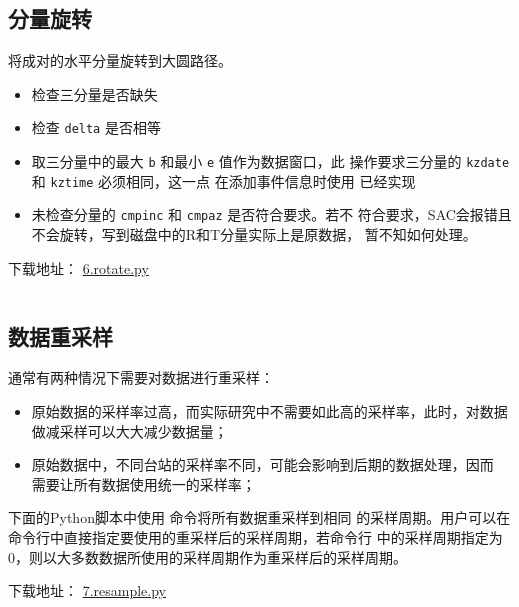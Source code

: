 \subsection{分量旋转}
\label{subsec:rotate-python}
将成对的水平分量旋转到大圆路径。
\begin{itemize}
\item 检查三分量是否缺失
\item 检查 \texttt{delta} 是否相等
\item 取三分量中的最大 \texttt{b} 和最小 \texttt{e} 值作为数据窗口，此
    操作要求三分量的 \texttt{kzdate} 和 \texttt{kztime} 必须相同，这一点
    在添加事件信息时使用  已经实现
\item 未检查分量的 \texttt{cmpinc} 和 \texttt{cmpaz} 是否符合要求。若不
    符合要求，SAC会报错且不会旋转，写到磁盘中的R和T分量实际上是原数据，
    暂不知如何处理。
\end{itemize}

下载地址： \href{https://raw.githubusercontent.com/seisman/SAC_Docs_zh/master/call-in-script/6.rotate.py}{6.rotate.py}
\inputminted{python}{./call-in-script/6.rotate.py}

\subsection{数据重采样}
\label{subsec:resample-python}
通常有两种情况下需要对数据进行重采样：
\begin{itemize}
\item 原始数据的采样率过高，而实际研究中不需要如此高的采样率，此时，对数据
    做减采样可以大大减少数据量；
\item 原始数据中，不同台站的采样率不同，可能会影响到后期的数据处理，因而
    需要让所有数据使用统一的采样率；
\end{itemize}
下面的Python脚本中使用  命令将所有数据重采样到相同
的采样周期。用户可以在命令行中直接指定要使用的重采样后的采样周期，若命令行
中的采样周期指定为0，则以大多数数据所使用的采样周期作为重采样后的采样周期。

下载地址： \href{https://raw.githubusercontent.com/seisman/SAC_Docs_zh/master/call-in-script/7.resample.py}{7.resample.py}
\inputminted{python}{./call-in-script/7.resample.py}
